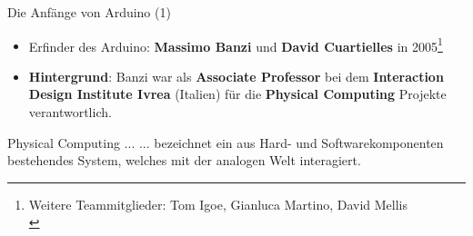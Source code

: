 \documentclass{beamer}
\begin{document}
\begin{frame}{Die Anf\"ange von Arduino (1)}
\begin{itemize}
	 \item Erfinder des Arduino: \textbf{Massimo Banzi} und \textbf{David Cuartielles} in 2005\footnote{Weitere Teammitglieder: Tom Igoe, Gianluca Martino, David Mellis\cite{IEEE:2016:TheMakingOfArduino}\\}
\end{itemize}
\begin{itemize}
	\item \textbf{Hintergrund}: Banzi war als \textbf{Associate Professor} bei dem \textbf{Interaction Design Institute Ivrea} (Italien) f\"ur die \textbf{Physical Computing} Projekte verantwortlich.
\end{itemize}
\begin{alertblock}{Physical Computing ...}
	... bezeichnet ein aus Hard- und Softwarekomponenten bestehendes System, welches mit der analogen Welt interagiert.
\end{alertblock}
\end{frame}
\end{document}
